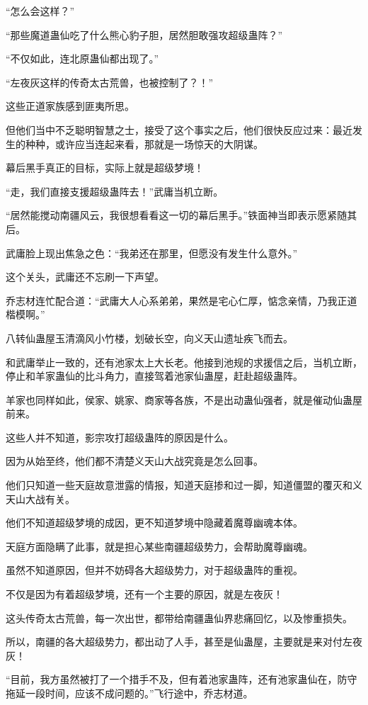 \begin{this_body}
“怎么会这样？”

“那些魔道蛊仙吃了什么熊心豹子胆，居然胆敢强攻超级蛊阵？”

“不仅如此，连北原蛊仙都出现了。”

“左夜灰这样的传奇太古荒兽，也被控制了？！”

这些正道家族感到匪夷所思。

但他们当中不乏聪明智慧之士，接受了这个事实之后，他们很快反应过来：最近发生的种种，或许应当连起来看，那就是一场惊天的大阴谋。

幕后黑手真正的目标，实际上就是超级梦境！

“走，我们直接支援超级蛊阵去！”武庸当机立断。

“居然能搅动南疆风云，我很想看看这一切的幕后黑手。”铁面神当即表示愿紧随其后。

武庸脸上现出焦急之色：“我弟还在那里，但愿没有发生什么意外。”

这个关头，武庸还不忘刷一下声望。

乔志材连忙配合道：“武庸大人心系弟弟，果然是宅心仁厚，惦念亲情，乃我正道楷模啊。”

八转仙蛊屋玉清滴风小竹楼，划破长空，向义天山遗址疾飞而去。

和武庸举止一致的，还有池家太上大长老。他接到池规的求援信之后，当机立断，停止和羊家蛊仙的比斗角力，直接驾着池家仙蛊屋，赶赴超级蛊阵。

羊家也同样如此，侯家、姚家、商家等各族，不是出动蛊仙强者，就是催动仙蛊屋前来。

这些人并不知道，影宗攻打超级蛊阵的原因是什么。

因为从始至终，他们都不清楚义天山大战究竟是怎么回事。

他们只知道一些天庭故意泄露的情报，知道天庭掺和过一脚，知道僵盟的覆灭和义天山大战有关。

他们不知道超级梦境的成因，更不知道梦境中隐藏着魔尊幽魂本体。

天庭方面隐瞒了此事，就是担心某些南疆超级势力，会帮助魔尊幽魂。

虽然不知道原因，但并不妨碍各大超级势力，对于超级蛊阵的重视。

不仅是因为有着超级梦境，还有一个主要的原因，就是左夜灰！

这头传奇太古荒兽，每一次出世，都带给南疆蛊仙界悲痛回忆，以及惨重损失。

所以，南疆的各大超级势力，都出动了人手，甚至是仙蛊屋，主要就是来对付左夜灰！

“目前，我方虽然被打了一个措手不及，但有着池家蛊阵，还有池家蛊仙在，防守拖延一段时间，应该不成问题的。”飞行途中，乔志材道。


\end{this_body}
